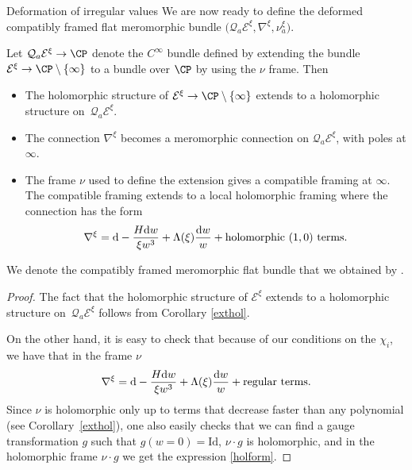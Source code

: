 \begin{subsubsection}{Deformation of irregular values}
We are now ready to define the deformed compatibly framed flat meromorphic bundle $\bigl(\mathcal{Q}_a\mathcal{E}^{\xi},\nabla^{\xi},\nu^{\xi}_{a}\bigr)$.

\begin{Proposition} Let $\mathcal{Q}_a\mathcal{E}^{\xi}\to \CP$ denote the $C^{\infty}$ bundle defined by extending the bundle~${\mathcal{E}^{\xi} \to \CP \setminus \{\infty\}}$ to a bundle over $\CP$ by using the $\nu$ frame. Then
\begin{itemize}\itemsep=0pt
 \item The holomorphic structure of $\mathcal{E}^{\xi} \to \CP \setminus \{\infty\}$ extends to a holomorphic structure on~$\mathcal{Q}_a\mathcal{E}^{\xi}$.
 \item The connection $\nabla^{\xi}$ becomes a meromorphic connection on $\mathcal{Q}_a\mathcal{E}^{\xi}$, with poles at $\infty$.
 \item The frame $\nu$ used to define the extension gives a compatible framing at $\infty$. The compatible framing extends to a local holomorphic framing where the connection has the form
 \begin{equation}\label{holform}
 \nabla^{\xi}= {\rm d}-\frac{H{\rm d}w}{\xi w^3}+\Lambda(\xi)\frac{{\rm d}w}{w} + \text{holomorphic $(1,0)$ terms}.
 \end{equation}
\end{itemize}
We denote the compatibly framed meromorphic flat bundle that we obtained by .
\end{Proposition}

\begin{proof}
The fact that the holomorphic structure of $\mathcal{E}^{\xi}$ extends to a holomorphic structure on~$\mathcal{Q}_a\mathcal{E}^{\xi}$ follows from Corollary \ref{exthol}.

On the other hand, it is easy to check that because of our conditions on the $\chi_i$, we have that in the frame $\nu$
\begin{equation*}
 \nabla^{\xi}= {\rm d}-\frac{H{\rm d}w}{\xi w^3}+\Lambda(\xi)\frac{{\rm d}w}{w} + \text{regular terms}.
\end{equation*}
Since $\nu$ is holomorphic only up to terms that decrease faster than any polynomial (see Corollary~\ref{exthol}), one also easily checks that we can find a gauge transformation $g$ such that $g(w=0)=\text{Id}$, $\nu \cdot g$ is holomorphic, and in the holomorphic frame $\nu \cdot g$ we get the expression \eqref{holform}.


\end{proof}
\end{subsubsection}
